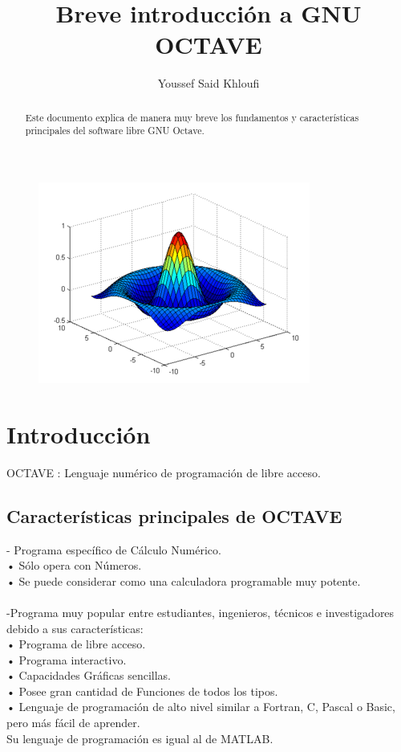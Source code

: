 \documentclass[a4,12pt]{article}
\title{Breve introducción a GNU OCTAVE}
\author{Youssef Said Khloufi}
\begin{document}
\maketitle
\bigskip
\bigskip
\bigskip
\begin{figure}[H]
  \centering
    \includegraphics{graficos/octave}
\end{figure}
\newpage

\maketitle

\begin{abstract}
Este documento explica de manera muy breve los fundamentos y características principales del software libre GNU Octave.

\end{abstract}

\tableofcontents
\newpage

\section{Introducción}

OCTAVE : Lenguaje numérico de programación de libre acceso.

\subsection{Características principales de OCTAVE}

- Programa específico de Cálculo Numérico.\\
• Sólo opera con Números.\\
• Se puede considerar como una calculadora programable muy potente.\\
\medskip\\
-Programa muy popular entre estudiantes, ingenieros, técnicos e investigadores debido a sus características:\\
• Programa de libre acceso.\\
• Programa interactivo.\\
• Capacidades Gráficas sencillas.\\
• Posee gran cantidad de Funciones de todos los tipos.\\
• Lenguaje de programación de alto nivel similar a Fortran, C, Pascal o Basic, pero más  fácil de aprender.\\
Su lenguaje de programación es igual al de MATLAB.
\end{document}
